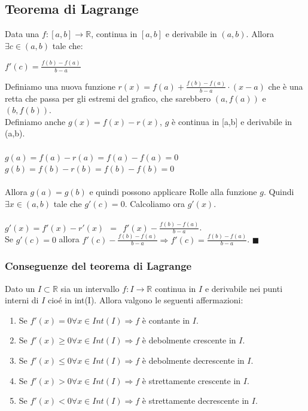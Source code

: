 \newpage
\subsection{Teorema di Lagrange}
\begin{theorem}
    Data una $f: [a,b] \to \mathbb{R}$, continua in $[a,b]$ e derivabile in $(a,b)$. Allora $\exists c \in (a,b)$ tale che:
    \begin{center}\vspace{-5pt}
        $f'(c) = \frac{f(b) - f(a)}{b - a}$
    \end{center}
\end{theorem}

\begin{demostration}
Definiamo una nuova funzione $r(x) = f(a) + \frac{f(b) - f(a)}{b - a}\cdot (x-a)$ che è una retta che passa per gli estremi del grafico, che sarebbero $(a,f(a))$ e $(b,f(b))$.\\
Definiamo anche $g(x) = f(x) - r(x)$, $g$ è continua in [a,b] e derivabile in (a,b).\\\\
$g(a) = f(a) - r(a) = f(a) - f(a) = 0$ \hspace{.5cm}$g(b) = f(b) - r(b) = f(b) - f(b) = 0$\\\\
Allora $g(a) = g(b)$ e quindi possono applicare Rolle alla funzione $g$. Quindi $\exists x \in (a,b)$ tale che $g'(c) = 0$. Calcoliamo ora $g'(x)$.\\\\
$g'(x) = f'(x) - r'(x) \:\:=\:\: f'(x) - \frac{f(b) - f(a)}{b - a}$.\\
Se $g'(c) = 0$ allora $f'(c) - \frac{f(b) - f(a)}{b - a} \Longrightarrow f'(c) = \frac{f(b) - f(a)}{b - a}$. $\blacksquare$
\end{demostration}

\subsubsection{Conseguenze del teorema di Lagrange}
\begin{theorem}
    Dato un $I \subset \mathbb{R}$ sia un intervallo $f: I \to \mathbb{R}$ continua in $I$ e derivabile nei punti interni di $I$ cioé in int(I). Allora valgono le seguenti affermazioni:
    \begin{enumerate}
        \item Se $f'(x) = 0 \forall x \in Int(I) \Longrightarrow f$ è contante in $I$.
        \item Se $f'(x) \geq 0 \forall x \in Int(I) \Longrightarrow f$ è debolmente crescente in $I$.
        \item Se $f'(x) \leq 0 \forall x \in Int(I) \Longrightarrow f$ è debolmente decrescente in $I$.
        \item Se $f'(x) > 0 \forall x \in Int(I) \Longrightarrow f$ è strettamente crescente in $I$.
        \item Se $f'(x) < 0 \forall x \in Int(I) \Longrightarrow f$ è strettamente decrescente in $I$.
    \end{enumerate}
\end{theorem}

